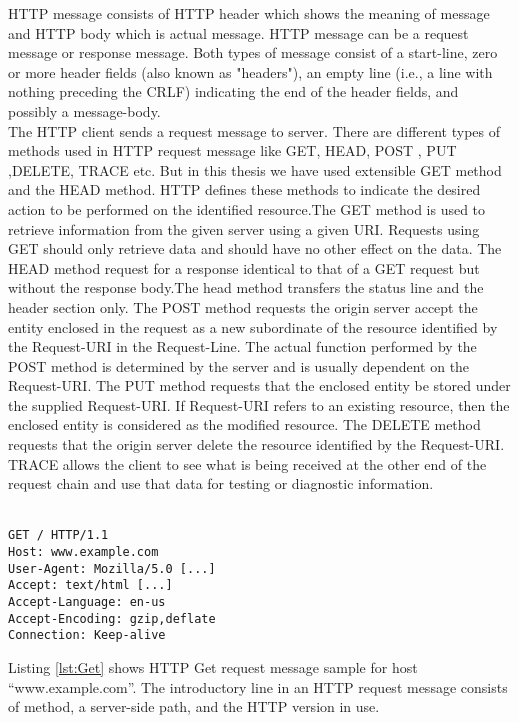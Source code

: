 \noindent HTTP message consists of HTTP header which shows the meaning of message and HTTP body which is actual message. HTTP message can be a request message or response message. Both types of message consist of a start-line, zero or more header fields (also known as "headers"), an empty line (i.e., a line with nothing preceding the CRLF) indicating the end of the header fields, and possibly a message-body.\\

\noindent The HTTP client sends a request message to server. There are different types of methods used in HTTP request message like GET, HEAD, POST , PUT ,DELETE, TRACE etc. But in this thesis we have used extensible GET method and the HEAD method. HTTP defines these methods to indicate the desired action to be performed on the identified resource.The GET method is used to retrieve information
from the given server using a given URI. Requests using GET should only retrieve data and should have no other effect on the data. The HEAD method request for a response identical to that of a GET request but without the response body.The head method transfers the status line and the header section only. The POST method requests the origin server accept the entity enclosed in the request as a new subordinate of the resource identified by the Request-URI in the Request-Line. The actual function performed by the POST method is determined by the server and is usually dependent on the Request-URI. The PUT method requests that the enclosed entity be stored under the supplied Request-URI. If Request-URI refers to an existing resource, then the enclosed entity is considered as the modified resource. The DELETE method requests that the origin server delete the resource identified by the Request-URI. TRACE allows the client to see what is being received at the other end of the request chain and use that data for testing or diagnostic information.\\\

\begin{lstlisting}[caption= HTTP Get Request message, label=lst:Get]
GET / HTTP/1.1
Host: www.example.com
User-Agent: Mozilla/5.0 [...]
Accept: text/html [...]
Accept-Language: en-us
Accept-Encoding: gzip,deflate
Connection: Keep-alive
\end{lstlisting}

\noindent Listing \ref{lst:Get} shows HTTP Get request message sample for host \enquote{www.example.com}. The introductory line in an HTTP request message consists of method, a server-side path, and the HTTP version in use. \\\

